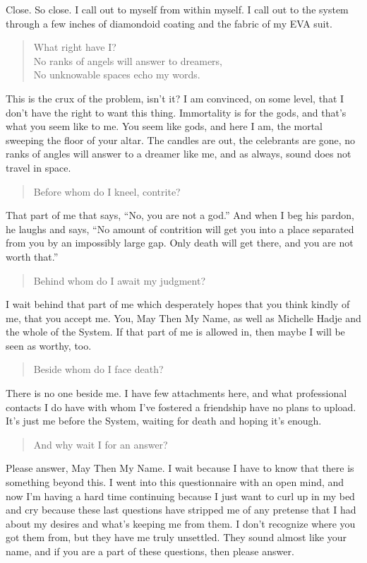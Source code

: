 \noindent Close. So close. I call out to myself from within myself. I call out to the system through a few inches of diamondoid coating and the fabric of my EVA suit.

\begin{quote}
What right have I?\\
No ranks of angels will answer to dreamers,\\
No unknowable spaces echo my words.
\end{quote}

\noindent This is the crux of the problem, isn't it? I am convinced, on some level, that I don't have the right to want this thing. Immortality is for the gods, and that's what you seem like to me. You seem like gods, and here I am, the mortal sweeping the floor of your altar. The candles are out, the celebrants are gone, no ranks of angles will answer to a dreamer like me, and as always, sound does not travel in space.

\begin{quote}
Before whom do I kneel, contrite?
\end{quote}

\noindent That part of me that says, ``No, you are not a god.'' And when I beg his pardon, he laughs and says, ``No amount of contrition will get you into a place separated from you by an impossibly large gap. Only death will get there, and you are not worth that.''

\begin{quote}
Behind whom do I await my judgment?
\end{quote}

\noindent I wait behind that part of me which desperately hopes that you think kindly of me, that you accept me. You, May Then My Name, as well as Michelle Hadje and the whole of the System. If that part of me is allowed in, then maybe I will be seen as worthy, too.

\begin{quote}
Beside whom do I face death?
\end{quote}

\noindent There is no one beside me. I have few attachments here, and what professional contacts I do have with whom I've fostered a friendship have no plans to upload. It's just me before the System, waiting for death and hoping it's enough.

\begin{quote}
And why wait I for an answer?
\end{quote}

\noindent Please answer, May Then My Name. I wait because I have to know that there is something beyond this. I went into this questionnaire with an open mind, and now I'm having a hard time continuing because I just want to curl up in my bed and cry because these last questions have stripped me of any pretense that I had about my desires and what's keeping me from them. I don't recognize where you got them from, but they have me truly unsettled. They sound almost like your name, and if you are a part of these questions, then please answer.
